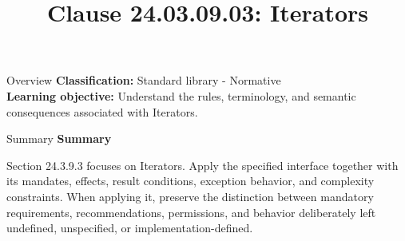 \documentclass[10pt,letterpaper]{article}
\title{Clause 24.03.09.03: Iterators}
\author{}
\date{}
\begin{document}
\maketitle
\begin{CornellOverviewBox}{Overview}
\textbf{Classification:} Standard library - Normative\\[2pt]
\textbf{Learning objective:} Understand the rules, terminology, and semantic consequences associated with Iterators.
\end{CornellOverviewBox}\begin{CornellSummaryBox}{Summary}
{\sffamily\bfseries\color{Accent} Summary}\par\vspace{3pt}Section 24.3.9.3 focuses on Iterators. Apply the specified interface together with its mandates, effects, result conditions, exception behavior, and complexity constraints. When applying it, preserve the distinction between mandatory requirements, recommendations, permissions, and behavior deliberately left undefined, unspecified, or implementation-defined.
\end{CornellSummaryBox}
\end{document}
